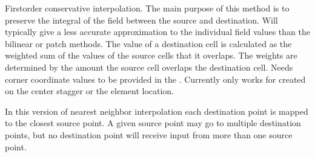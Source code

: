 \documentclass[letterpaper,10pt,english]{sphinxmanual}
\begin{document}
\begin{fulllineitems}
\begin{fulllineitems}
\end{fulllineitems}


\begin{fulllineitems}
\label{\detokenize{RegridMethod:ESMF.api.constants.RegridMethod.CONSERVE}}
First\sphinxhyphen{}order conservative interpolation. The main purpose of this method is 
to preserve the integral of the field between the source and destination. 
Will typically give a less accurate approximation to the individual field 
values than the bilinear or patch methods. The value of a destination cell 
is calculated as the weighted sum of the values of the source cells that it 
overlaps. The weights are determined by the amount the source cell overlaps 
the destination cell. Needs corner coordinate values to be provided in the 
{\hyperref[\detokenize{grid:ESMF.api.grid.Grid}]{}}. Currently only works for 
{\hyperref[\detokenize{field:ESMF.api.field.Field}]{}} created on the 
{\hyperref[\detokenize{grid:ESMF.api.grid.Grid}]{}} center stagger or 
the {\hyperref[\detokenize{mesh:ESMF.api.mesh.Mesh}]{}} element location.

\end{fulllineitems}


\begin{fulllineitems}
\label{\detokenize{RegridMethod:ESMF.api.constants.RegridMethod.NEAREST_STOD}}
In this version of nearest neighbor interpolation each destination point is 
mapped to the closest source point. A given source point may go to multiple 
destination points, but no destination point will receive input from more 
than one source point.

\end{fulllineitems}


\end{fulllineitems}
\end{document}
